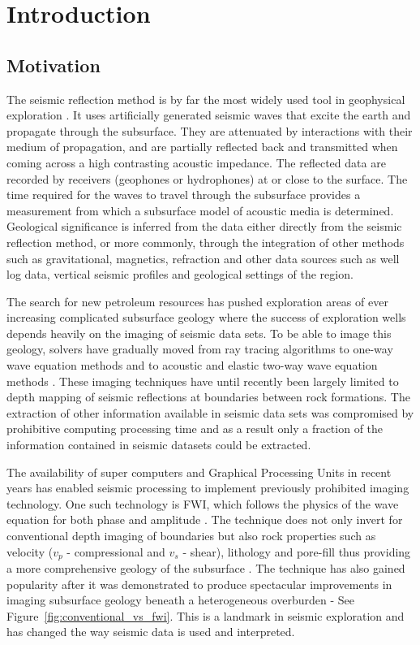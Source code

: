 \chapter{Introduction}

\section{Motivation}\label{sec:intro_motivation}
The seismic reflection method is by far the most widely used tool in geophysical exploration \citep{Sheriff1985}. It uses artificially generated seismic waves that excite the earth and propagate through the subsurface. They are attenuated by interactions with their medium of propagation, and are partially reflected back and transmitted when coming across a high contrasting acoustic impedance. The reflected data are recorded by receivers (geophones or hydrophones) at or close to the surface. The time required for the waves to travel through the subsurface provides a measurement from which a subsurface model of acoustic media is determined. Geological significance is inferred from the data either directly from the seismic reflection method, or more commonly, through the integration of other methods such as gravitational, magnetics, refraction and other data sources such as well log data, vertical seismic profiles and geological settings of the region. 

The search for new petroleum resources has pushed exploration areas of ever increasing complicated subsurface geology where the success of exploration wells depends heavily on the imaging of seismic data sets. To be able to image this geology, solvers have gradually moved from ray tracing algorithms to one-way wave equation methods and to acoustic and elastic two-way wave equation methods \citep{Nangoo2013}. These imaging techniques have until recently been largely limited to depth mapping of seismic reflections at boundaries between rock formations. The extraction of other information available in seismic data sets was compromised by prohibitive computing processing time and as a result only a fraction of the information contained in seismic datasets could be extracted.

The availability of super computers and Graphical Processing Units in recent years has enabled seismic processing to implement previously prohibited imaging technology. One such technology is \ac{FWI}, which follows the physics of the wave equation for both phase and amplitude \citep{Tarantola1987}. The technique does not only invert for conventional depth imaging of boundaries but also rock properties such as velocity ($v_p$ - compressional and $v_s$ - shear), lithology and pore-fill thus providing a more comprehensive geology of the subsurface \citep{Plessix2014}. The technique has also gained popularity after it was demonstrated to produce spectacular improvements in imaging subsurface geology beneath a heterogeneous overburden - See Figure~\ref{fig:conventional_vs_fwi}. This is a landmark in seismic exploration and has changed the way seismic data is used and interpreted.

